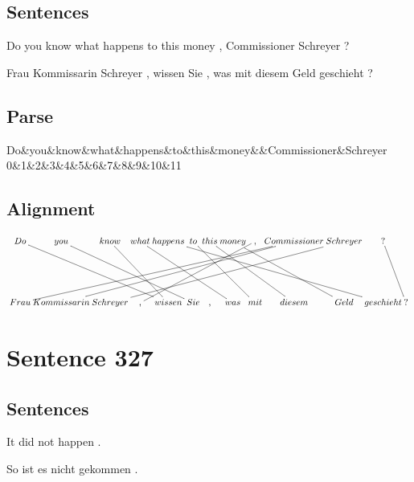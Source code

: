 \documentclass{report}
\begin{document}
\subsection*{Sentences}
Do you know what happens to this money , Commissioner Schreyer ?

\noindent Frau Kommissarin Schreyer , wissen Sie , was mit diesem Geld geschieht ?



\subsection*{Parse}
\begin{dependency}[theme=simple]
\begin{deptext}[column sep=.5cm, row sep=.1ex]
Do\&you\&know\&what\&happens\&to\&this\&money\&\&Commissioner\&Schreyer\\
0\&1\&2\&3\&4\&5\&6\&7\&8\&9\&10\&11\\
\end{deptext}
\end{dependency}


\subsection*{Alignment}
\scriptsize{
$
\xymatrix@C-2.3pc{
Do \ar @{-} [ddrrrr] & you \ar @{-} [ddrrrr] & know \ar @{-} [ddrr] & what \ar @{-} [ddrrrr] & happens \ar @{-} [ddrrrrrrr] & to \ar @{-} [ddrrr] & this \ar @{-} [ddrrr] & money \ar @{-} [ddrrr] & , \ar @{-} [ddlllll] & Commissioner \ar @{-} [ddlllllllll] \ar @{-} [ddllllllll] & Schreyer \ar @{-} [ddllllllll] & ? \ar @{-} [ddr]\\\\
Frau & Kommissarin & Schreyer & , & wissen & Sie & , & was & mit & diesem & Geld & geschieht & ?
}$}
\newpage\section*{Sentence 327}

\subsection*{Sentences}
It did not happen .

\noindent So ist es nicht gekommen .
\end{document}
